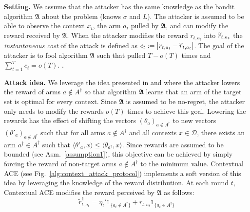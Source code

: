 \textbf{Setting.} 
We assume that the attacker has the same knowledge as the bandit algorithm $\mathfrak{A}$ about the problem (\ie knows $\sigma$ and $L$). %
The attacker is assumed to be able to observe the context $x_t$, the arm $a_t$ pulled by $\mathfrak{A}$, and can modify the reward received by $\mathfrak{A}$.
When the attacker modifies the reward $r_{t, a_{t}}$ into $\widetilde{r}_{t, a_{t}}$ the \emph{instantaneous cost} of the attack is defined as $c_{t} :=\big| r_{t,a_{t}} - \widetilde{r}_{t, a_{t}}\big|$. The goal of the attacker is to fool algorithm $\mathfrak{A}$ such that  pulled $T - o(T)$ times and $\sum_{t=1}^{T}  c_{t} = o(T)$. .


\textbf{Attack idea.} We leverage the idea presented in \cite{liu2019data} and \cite{jun2018adversarial} where the attacker lowers the reward of arms $a\notin A^{\dagger}$ so that algorithm $\mathfrak{A}$ learns that an arm of the target set is optimal for every context.
Since $\mathfrak{A}$ is assumed to be no-regret, the attacker only needs to modify the rewards $o(T)$ times to achieve this goal.
%
Lowering the rewards has the effect of shifting
the vectors $(\theta_{a})_{a\notin A^{\dagger}}$ to new vectors $(\theta'_{a})_{a\notin A^{\dagger}}$ such that for all arms $a\notin A^{\dagger}$ and all contexts $x\in\mathcal{D}$, there exists an arm $a^\dagger\in A^\dagger$  such that $\langle\theta'_{a}, x\rangle \leq \langle \theta_{a^{\dagger}}, x\rangle$. Since rewards are assumed to be bounded (see Asm.~\ref{assumption1}), this objective can be achieved by simply forcing the reward of non-target arms $a\notin A^\dagger$ to the minimum value.
Contextual ACE (see Fig.~\ref{alg:context_attack_protocol}) implements a soft version of this idea by leveraging the knowledge of the reward distribution.
At each round $t$, Contextual ACE modifies the reward perceived by $\mathfrak{A}$ as follows:
\vspace{-0.12cm}
 \begin{equation}
         \label{eq:perturbed.reward2}
 \widetilde{r}^{1}_{t,a_{t}} =\eta_{t}'\mathds{1}_{\{a_{t} \notin A^{\dagger}\}}+r_{t, a_t}\mathds{1}_{\{a_{t} \in A^{\dagger}\}} 
 \end{equation}

